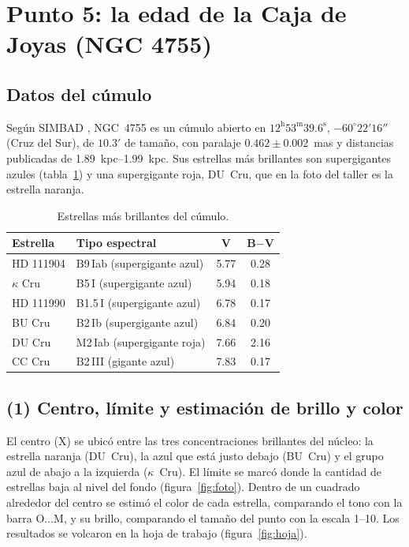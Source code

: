 \documentclass[11pt,a4paper]{article}
\begin{document}
\section{Punto 5: la edad de la Caja de Joyas (NGC 4755)}

\subsection{Datos del cúmulo}
Según SIMBAD \cite{simbad}, NGC~4755 es un cúmulo abierto en $12^\text{h}53^\text{m}39.6^\text{s}$,
$-60^\circ22'16''$ (Cruz del Sur), de $10.3'$ de tamaño, con paralaje $0.462 \pm 0.002$~mas y
distancias publicadas de \SIrange{1.89}{1.99}{kpc}. Sus estrellas más brillantes son supergigantes
azules (tabla~\ref{tab:estrellas}) y una supergigante roja, DU~Cru, que en la foto del taller es la
estrella naranja.

\begin{table}[H]
\centering
\caption{Estrellas más brillantes del cúmulo.}
\label{tab:estrellas}
\begin{tabular}{llcc}
\toprule
Estrella & Tipo espectral & V & B$-$V \\
\midrule
HD 111904 & B9\,Iab (supergigante azul) & 5.77 & 0.28 \\
$\kappa$ Cru & B5\,I (supergigante azul) & 5.94 & 0.18 \\
HD 111990 & B1.5\,I (supergigante azul) & 6.78 & 0.17 \\
BU Cru & B2\,Ib (supergigante azul) & 6.84 & 0.20 \\
DU Cru & M2\,Iab (supergigante roja) & 7.66 & 2.16 \\
CC Cru & B2\,III (gigante azul) & 7.83 & 0.17 \\
\bottomrule
\end{tabular}
\end{table}

\subsection{(1) Centro, límite y estimación de brillo y color}
El centro (X) se ubicó entre las tres concentraciones brillantes del núcleo: la estrella naranja
(DU~Cru), la azul que está justo debajo (BU~Cru) y el grupo azul de abajo a la izquierda
($\kappa$~Cru). El límite se marcó donde la cantidad de estrellas baja al nivel del fondo
(figura~\ref{fig:foto}). Dentro de un cuadrado alrededor del centro se estimó el color de cada
estrella, comparando el tono con la barra O$\ldots$M, y su brillo, comparando el tamaño del punto con
la escala 1--10. Los resultados se volcaron en la hoja de trabajo (figura~\ref{fig:hoja}).
\end{document}
